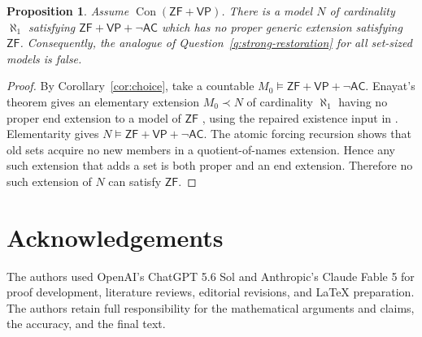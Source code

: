 \documentclass[11pt,a4paper]{amsart}
\newcommand{\VP}{\mathsf{VP}}
\newcommand{\AC}{\mathsf{AC}}
\newcommand{\ZF}{\mathsf{ZF}}
\newcommand{\Con}{\operatorname{Con}}
\theoremstyle{plain}
\newtheorem{proposition}[theorem]{Proposition}
\theoremstyle{definition}
\theoremstyle{remark}
\begin{document}
\begin{proposition}\label{prop:countability-essential}
Assume $\Con(\ZF+\VP)$.  There is a model $N$ of cardinality $\aleph_1$ satisfying $\ZF+\VP+\neg\AC$ which has no proper generic extension satisfying $\ZF$.  Consequently, the analogue of Question~\ref{q:strong-restoration} for all set-sized models is false.
\end{proposition}

\begin{proof}
By Corollary~\ref{cor:choice}, take a countable $M_0\models\ZF+\VP+\neg\AC$.  Enayat's theorem gives an elementary extension $M_0\prec N$ of cardinality $\aleph_1$ having no proper end extension to a model of $\ZF$ {\color{auditgreen}\cite[Theorem~5.18]{Enayat}, using the repaired existence input in \cite[Enayat supplement]{RepairNotes}.  Elementarity gives} $N\models\ZF+\VP+\neg\AC$.  {The atomic forcing recursion shows that old sets acquire no new members in a quotient-of-names extension.  Hence any such extension that adds a set is both proper and an end extension.}  Therefore no such extension of $N$ can satisfy $\ZF$.
\end{proof}
\endgroup

\section*{Acknowledgements}

{The authors used OpenAI's ChatGPT 5.6 Sol and Anthropic's Claude Fable 5 for proof development, literature reviews, editorial revisions, and LaTeX preparation.  The authors retain full responsibility for the mathematical arguments and claims, the accuracy, and the final text.}
\end{document}
